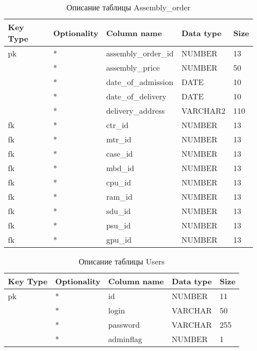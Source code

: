 \begin{xltabular}{\textwidth}{|X|X|p{4.0cm}|X|X|}
	\caption{Описание таблицы Assembly\_order\label{tab:aso}}\\
	\hline
	Key Type & Optionality & Column name & Data type & Size \\ \hline
	pk & * & assembly\_order\_id & NUMBER & 13 \\ \hline
	& * & assembly\_price & NUMBER & 50 \\ \hline
	& * & date\_of\_admission & DATE & 10 \\ \hline
	& * & date\_of\_delivery & DATE & 10 \\ \hline
	& * & delivery\_address & VARCHAR2 & 110 \\ \hline
	fk & * & ctr\_id & NUMBER & 13 \\ \hline
	fk & * & mtr\_id & NUMBER & 13 \\ \hline
	fk & * & case\_id & NUMBER & 13 \\ \hline
	fk & * & mbd\_id & NUMBER & 13 \\ \hline
	fk & * & cpu\_id & NUMBER & 13 \\ \hline
	fk & * & ram\_id & NUMBER & 13 \\ \hline
	fk & * & sdu\_id & NUMBER & 13 \\ \hline
	fk & * & psu\_id & NUMBER & 13 \\ \hline
	fk & * & gpu\_id & NUMBER & 13 \\ \hline
\end{xltabular}

\begin{xltabular}{\textwidth}{|X|X|p{4.0cm}|X|X|}
	\caption{Описание таблицы Users\label{tab:users}}\\
	\hline
	Key Type & Optionality & Column name & Data type & Size \\ \hline
	pk & * & id & NUMBER & 11 \\ \hline
	& * & login & VARCHAR & 50 \\ \hline
	& * & password & VARCHAR & 255 \\ \hline
	& * & adminflag & NUMBER & 1 \\ \hline
\end{xltabular}

\renewcommand{\arraystretch}{1.0}


